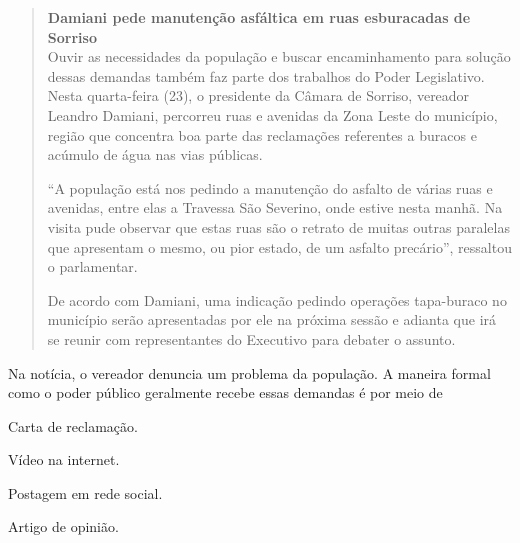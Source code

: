 \begin{quote}
\centering\noindent\textbf{Damiani pede manutenção asfáltica em ruas esburacadas de Sorriso}\\


\noindent Ouvir as necessidades da população e buscar encaminhamento para solução
dessas demandas também faz parte dos trabalhos do Poder Legislativo.
Nesta quarta-feira (23), o presidente da Câmara de Sorriso, vereador
Leandro Damiani, percorreu ruas e avenidas da Zona Leste do município,
região que concentra boa parte das reclamações referentes a buracos e
acúmulo de água nas vias públicas.

``A população está nos pedindo a manutenção do asfalto de várias ruas e
avenidas, entre elas a Travessa São Severino, onde estive nesta manhã.
Na visita pude observar que estas ruas são o retrato de muitas outras
paralelas que apresentam o mesmo, ou pior estado, de um asfalto
precário'', ressaltou o parlamentar.

De acordo com Damiani, uma indicação pedindo operações tapa-buraco no
município serão apresentadas por ele na próxima sessão e adianta que irá
se reunir com representantes do Executivo para debater o assunto.

\end{quote}

\noindent Na notícia, o vereador denuncia um problema da população. A maneira
formal como o poder público geralmente recebe essas demandas é por meio
de

\begin{escolha}
\item Carta de reclamação.
\item Vídeo na internet.
\item Postagem em rede social.
\item Artigo de opinião.
\end{escolha}


